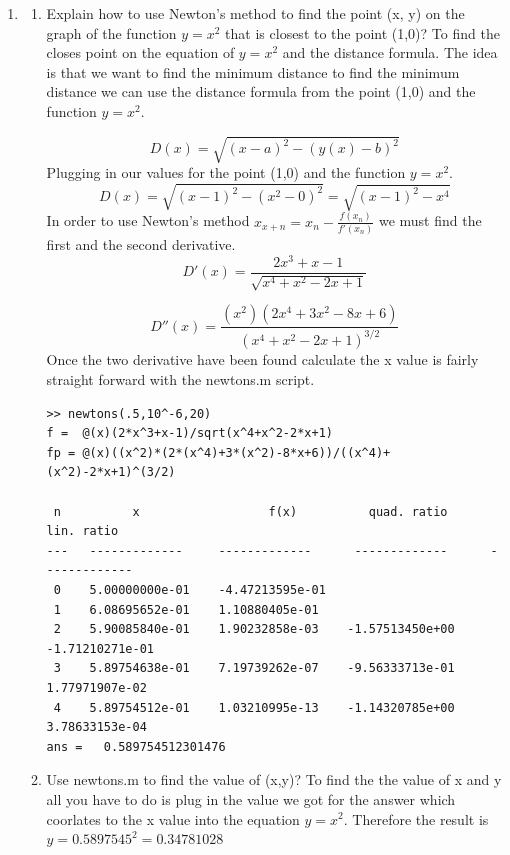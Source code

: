 \documentclass{article}
\begin{document}
\begin{enumerate}
\newpage\item
\begin{mdframed}[style=MyFrame]
\begin{enumerate}
\item Explain how to use Newton's method to find the point (x, y) on the graph of the function $y=x^2$ that is closest to the point (1,0)? To find the closes point on the equation of $y=x^2$ and the distance formula. The idea is that we want to find the minimum distance to find the minimum distance we can use the distance formula from the point (1,0) and the function $y=x^2$. 

\begin{equation}
D(x) = \sqrt{(x-a)^2-(y(x)-b)^2}
\end{equation}
Plugging in our values for the point (1,0) and the function $y=x^2$.
\begin{equation}
D(x) = \sqrt{(x-1)^2-(x^2-0)^2} = \sqrt{(x-1)^2-x^4}
\end{equation}
In order to use Newton's method $x_{x+n}=x_n-\frac{f(x_n)}{f'(x_n)}$ we must find the first and the second derivative. 
\begin{equation}
    D'(x)  = \frac{2 x^3+x-1}{\sqrt{x^4+x^2-2  x+1}}
\end{equation}

\begin{equation}
    D''(x) = \frac{(x^2) (2x^4+3 x^2-8 x+6)}{(x^4+x^2-2 x+1)^{3/2}}
\end{equation}
Once the two derivative have been found calculate the x value is fairly straight forward with the newtons.m script.
\begin{verbatim}
>> newtons(.5,10^-6,20)
f =  @(x)(2*x^3+x-1)/sqrt(x^4+x^2-2*x+1)
fp = @(x)((x^2)*(2*(x^4)+3*(x^2)-8*x+6))/((x^4)+(x^2)-2*x+1)^(3/2)

 n          x                  f(x)          quad. ratio       lin. ratio
---   -------------     -------------      -------------      -------------
 0    5.00000000e-01    -4.47213595e-01
 1    6.08695652e-01    1.10880405e-01
 2    5.90085840e-01    1.90232858e-03    -1.57513450e+00    -1.71210271e-01
 3    5.89754638e-01    7.19739262e-07    -9.56333713e-01     1.77971907e-02
 4    5.89754512e-01    1.03210995e-13    -1.14320785e+00     3.78633153e-04
ans =   0.589754512301476
\end{verbatim}
\item Use newtons.m to find the value of (x,y)? To find the the value of x and y all you have to do is plug in the value we got for the answer which coorlates to the x value into the equation $y=x^2$. Therefore the result is $y=0.5897545^2=0.34781028$

\end{enumerate}
\end{mdframed}

\end{enumerate}
\end{document}
